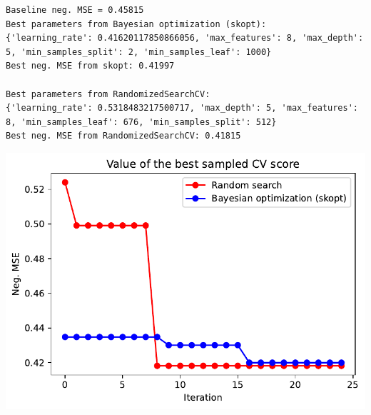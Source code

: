 \documentclass[
  12pt,
  letterpaper,
  DIV=11,
  numbers=noendperiod]{scrartcl}
\begin{document}
\begin{verbatim}
Baseline neg. MSE = 0.45815
Best parameters from Bayesian optimization (skopt):
{'learning_rate': 0.41620117850866056, 'max_features': 8, 'max_depth': 5, 'min_samples_split': 2, 'min_samples_leaf': 1000}
Best neg. MSE from skopt: 0.41997

Best parameters from RandomizedSearchCV:
{'learning_rate': 0.5318483217500717, 'max_depth': 5, 'max_features': 8, 'min_samples_leaf': 676, 'min_samples_split': 512}
Best neg. MSE from RandomizedSearchCV: 0.41815
\end{verbatim}

\includegraphics{ProyFinal_OptBayesiana_2024_files/figure-pdf/cell-23-output-2.pdf}
\end{document}
